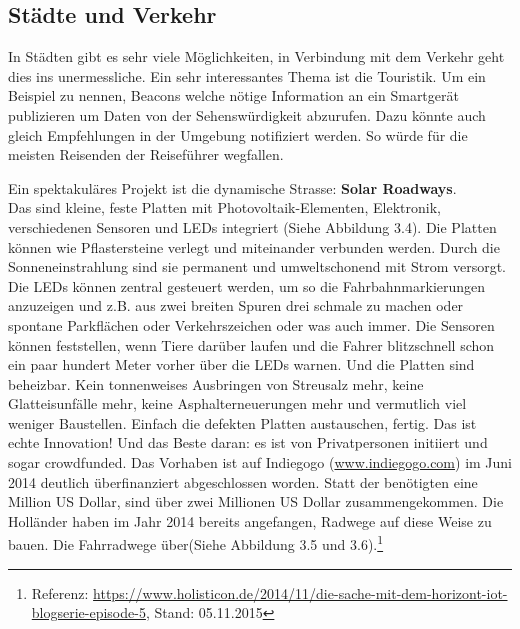 \subsection{Städte und Verkehr}
In Städten gibt es sehr viele Möglichkeiten, in Verbindung mit dem Verkehr geht dies ins unermessliche.
Ein sehr interessantes Thema ist die Touristik. Um ein Beispiel zu nennen, Beacons welche nötige Information an ein Smartgerät publizieren um Daten von der Sehenswürdigkeit abzurufen. Dazu könnte auch gleich Empfehlungen in der Umgebung notifiziert werden. So würde für die meisten Reisenden der Reiseführer wegfallen.

Ein spektakuläres Projekt ist die dynamische Strasse: \textbf{Solar Roadways}.\\
Das sind kleine, feste Platten mit Photovoltaik-Elementen, Elektronik, verschiedenen Sensoren und LEDs integriert (Siehe Abbildung 3.4). Die Platten können wie Pflastersteine verlegt und miteinander verbunden werden. Durch die Sonneneinstrahlung sind sie permanent und umweltschonend mit Strom versorgt. Die LEDs können zentral gesteuert werden, um so die Fahrbahnmarkierungen anzuzeigen und z.B. aus zwei breiten Spuren drei schmale zu machen oder spontane Parkflächen oder Verkehrszeichen oder was auch immer. Die Sensoren können feststellen, wenn Tiere darüber laufen und die Fahrer blitzschnell schon ein paar hundert Meter vorher über die LEDs warnen.  Und die Platten sind beheizbar. Kein tonnenweises Ausbringen von Streusalz mehr, keine Glatteisunfälle mehr, keine Asphalterneuerungen mehr und vermutlich viel weniger Baustellen. Einfach die defekten Platten austauschen, fertig. Das ist echte Innovation! Und das Beste daran: es ist von Privatpersonen initiiert und sogar crowdfunded. Das Vorhaben ist auf Indiegogo (\url{www.indiegogo.com}) im Juni 2014 deutlich überfinanziert abgeschlossen worden. Statt der benötigten eine Million US Dollar, sind über zwei Millionen US Dollar zusammengekommen. Die Holländer haben im Jahr 2014 bereits angefangen, Radwege auf diese Weise zu bauen. Die Fahrradwege über(Siehe Abbildung 3.5 und 3.6).\footnote{Referenz: \url{https://www.holisticon.de/2014/11/die-sache-mit-dem-horizont-iot-blogserie-episode-5}, Stand: 05.11.2015}
